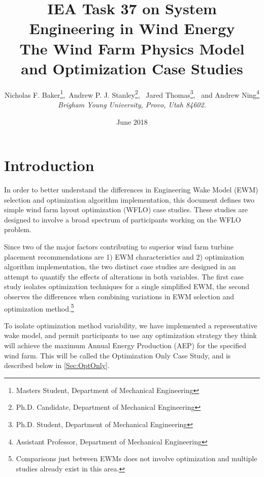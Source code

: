 \documentclass[12pt]{article}
\begin{document}
\title{IEA Task 37 on System Engineering in Wind Energy \\
\large The Wind Farm Physics Model and Optimization Case Studies}
\author{Nicholas F. Baker\thanks{Masters Student, Department of Mechanical Engineering},\  Andrew P. J. Stanley\thanks{Ph.D. Candidate, Department of Mechanical Engineering}, \ Jared Thomas\thanks{Ph.D. Student, Department of Mechanical Engineering}, \ and Andrew Ning\thanks{Assistant Professor, Department of Mechanical Engineering} \\
    {\normalsize\itshape Brigham Young University, Provo, Utah 84602.}\\
\date{June 2018}}

\maketitle{}
\vspace{-1cm}
\tableofcontents

\section{Introduction}

In order to better understand the differences in Engineering Wake Model (EWM) selection and optimization algorithm implementation, this document defines two simple wind farm layout optimization (WFLO) case studies. These studies are designed to involve a broad spectrum of participants working on the WFLO problem.
    
    Since two of the major factors contributing to superior wind farm turbine placement recommendations are 1) EWM characteristics and 2) optimization algorithm implementation, the two distinct case studies are designed in an attempt to quantify the effects of alterations in both variables. The first case study isolates optimization techniques for a single simplified EWM, the second observes the differences when combining variations in EWM selection and optimization method.\footnote{Comparisons just between EWMs does not involve optimization and multiple studies already exist in this area.}
    
    To isolate optimization method variability, we have implemented a representative wake model, and permit participants to use any optimization strategy they think will achieve the maximum Annual Energy Production (AEP) for the specified wind farm. This will be called the Optimization Only Case Study, and is described below in \cref{Sec:OptOnly}.
    
\end{document}
